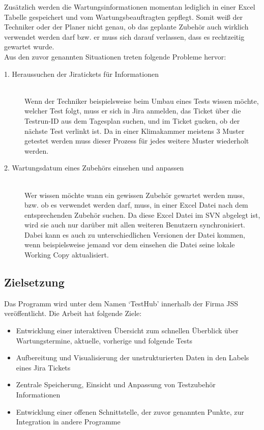 Zusätzlich werden die Wartungsinformationen momentan lediglich in einer Excel
Tabelle gespeichert und vom Wartungsbeauftragten gepflegt. Somit
weiß der \gls{Techniker} oder der \gls{Planer} nicht genau, ob das geplante 
Zubehör auch wirklich verwendet werden darf bzw. er muss sich darauf verlassen, 
dass es rechtzeitig gewartet wurde.\\

\pagebreak
Aus den zuvor genannten Situationen treten folgende Probleme hervor:

\begin{description}

    \item[1. Heraussuchen der Jiratickets für Informationen]\hfill \\
    Wenn der Techniker beispielsweise beim Umbau eines Tests wissen möchte,
    welcher Test folgt, muss er sich in Jira anmelden, das Ticket über die
    Testrun-ID aus dem Tagesplan suchen, und im Ticket gucken, ob der nächste 
    Test verlinkt ist. Da in einer Klimakammer meistens 3 Muster getestet werden
    muss dieser Prozess für jedes weitere Muster wiederholt werden.
    

    \item[2. Wartungsdatum eines Zubehörs einsehen und anpassen]\hfill \\
    Wer wissen möchte wann ein gewissen Zubehör gewartet werden muss, bzw. ob 
    es verwendet werden darf, muss, in einer Excel Datei nach dem entsprechenden
    Zubehör suchen. Da diese Excel Datei im \gls{SVN} abgelegt ist, wird sie auch nur
    darüber mit allen weiteren Benutzern synchronisiert. Dabei kann es auch zu 
    unterschiedlichen Versionen der Datei kommen, wenn beispielsweise jemand 
    vor dem einsehen die Datei seine lokale Working Copy aktualisiert.


\end{description}


\subsection{Zielsetzung}
Das Programm wird unter dem Namen `TestHub' innerhalb der Firma \gls{JSS} 
veröffentlicht. Die Arbeit hat folgende Ziele:

\begin{itemize}
\item Entwicklung einer interaktiven Übersicht zum schnellen Überblick über Wartungstermine, aktuelle, vorherige und folgende Tests 
\item Aufbereitung und Visualisierung der unstrukturierten Daten in den Labels eines Jira Tickets
\item Zentrale Speicherung, Einsicht und Anpassung von Testzubehör Informationen
\item Entwicklung einer offenen Schnittstelle, der zuvor genannten Punkte, zur Integration in andere Programme

\end{itemize}

